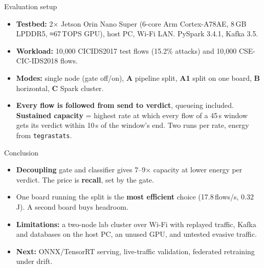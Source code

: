 \documentclass{article}
\newcommand{\key}[1]{\textbf{\textcolor{accBlue}{#1}}}
\newcommand{\good}[1]{\textbf{\textcolor{accGreen!80!black}{#1}}}
\newcommand{\bad}[1]{\textbf{\textcolor{accRed}{#1}}}
\begin{document}
\begin{lrbox}{\colL}
\begin{minipage}[t][\colheight][t]{381mm}
\vfill
\begin{sect}{Evaluation setup}
  \begin{itemize}
    \item \textbf{Testbed:} 2× Jetson Orin Nano Super (6-core Arm
          Cortex-A78AE, 8\,GB LPDDR5, ≈67\,TOPS GPU), host PC, Wi-Fi LAN.
          PySpark 3.4.1, Kafka 3.5.
    \item \textbf{Workload:} 10{,}000 CICIDS2017 test flows (15.2\% attacks)
          and 10{,}000 CSE-CIC-IDS2018 flows.
    \item \textbf{Modes:} single node (gate off/on), \key{A} pipeline split,
          \key{A1} split on one board, \key{B} horizontal, \key{C} Spark cluster.
    \item \textbf{Every flow is followed from send to verdict}, queueing
          included. \key{Sustained capacity} = highest rate at which every flow
          of a 45\,s window gets its verdict within 10\,s of the window's end. Two runs per rate, energy from \texttt{tegrastats}.
  \end{itemize}
\end{sect}

\vfill
\begin{sect}[colframe=hustRed, colbacktitle=hustRed]{Conclusion}
  \begin{itemize}
    \item \key{Decoupling} gate and classifier gives 7--9× capacity
          at lower energy per verdict. The price is \bad{recall}, set by the gate.
    \item One board running the split is the \good{most efficient} choice
          (17.8\,flows/s, 0.32\,J). A second board buys headroom.
    \item \textbf{Limitations:} a two-node lab cluster over Wi-Fi with
          replayed traffic, Kafka and databases on the host PC, an unused GPU,
          and untested evasive traffic.
    \item \textbf{Next:} ONNX/TensorRT serving, live-traffic validation,
          federated retraining under drift.
  \end{itemize}
\end{sect}
\end{minipage}%
\end{lrbox}%
\end{document}
